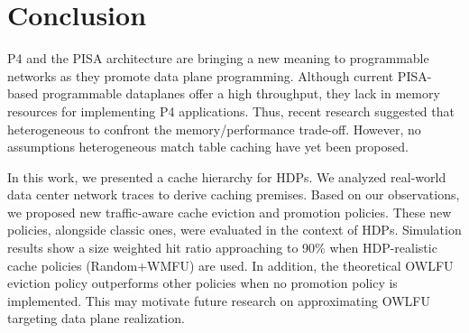 \section{Conclusion}\label{sec:conclusion}

P4 and the PISA architecture are bringing a new meaning to programmable networks as they promote data plane programming.
Although current PISA-based programmable dataplanes offer a high throughput, they lack in memory resources for implementing P4 applications.
Thus, recent research suggested that heterogeneous to confront the memory/performance trade-off.
However, no assumptions heterogeneous match table caching have yet been proposed.

In this work, we presented a cache hierarchy for HDPs.
We analyzed real-world data center network traces to derive caching premises.
Based on our observations, we proposed new traffic-aware cache eviction and promotion policies.
These new policies, alongside classic ones, were evaluated in the context of HDPs.
Simulation results show a size weighted hit ratio approaching to 90\% when HDP-realistic cache policies (Random+WMFU) are used.
In addition, the theoretical OWLFU eviction policy outperforms other policies when no promotion policy is implemented.
This may motivate future research on approximating OWLFU targeting data plane realization. 